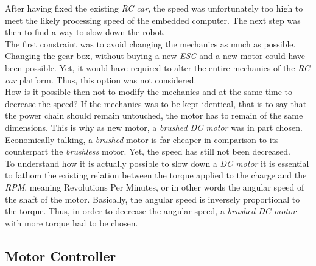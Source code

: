 		After having fixed the existing \textit{RC car}, the speed was unfortunately 
		too high to meet the likely processing speed of the embedded computer.
		The next step
		was then to find a way to slow down the robot. 
		\\\indent The first constraint was to avoid changing the mechanics as much as
		possible. Changing the gear box, without buying a new \textit{ESC} and a new
		motor could have been possible. Yet, it would have required to alter 
		the entire mechanics of the \textit{RC car} platform. Thus, this option was 
		not considered.
		\\\indent How is it possible then not to modify the mechanics and
		at the same time to decrease the speed? If the mechanics was to 
		be kept identical, that is to say that the power chain should 
		remain untouched, the motor has to remain of the same dimensions.
		This is why as new motor, a \textit{brushed DC motor} was in part 
		chosen. Economically talking, a \textit{brushed} motor is far cheaper
		in comparison to its counterpart the \textit{brushless} motor. Yet, the
		speed has still not been decreased.
		\\\indent To understand how it is actually possible to 
		slow down a \textit{DC motor} it is essential to fathom the 
		existing relation between the torque applied to the charge
		and the \textit{RPM}, meaning Revolutions Per Minutes,
		or in other words the angular speed 
		of the shaft of the motor. Basically, the angular speed is
		inversely proportional 
		to the torque. Thus, in order to decrease the angular speed, a 
		\textit{brushed DC motor} with more torque had to be chosen. \cite{bonanza, motor}
		
		\subsection{Motor Controller}
		
